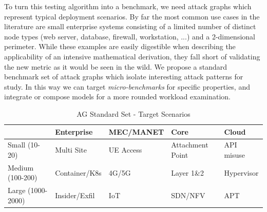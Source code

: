 To turn this testing algorithm into a benchmark, we need attack graphs which represent typical deployment scenarios. By far the most common use cases in the literature are small enterprise systems consisting of a limited number of distinct node types (web server, database, firewall, workstation, ...) and a 2-dimensional perimeter. While these examples are easily digestible when describing the applicability of an intensive mathematical derivation, they fall short of validating the new metric as it would be seen in the wild. We propose a standard benchmark set of attack graphs which isolate interesting attack patterns for study. In this way we can target \textit{micro-benchmarks} for specific properties, and integrate or compose models for a more rounded workload examination.

\begin{table}[ht]
\centering
\caption{AG Standard Set - Target Scenarios}
\label{tab:ag_standard_set}
\begin{tabular}{@{}p{.15\linewidth}p{.15\linewidth}p{.15\linewidth}p{.15\linewidth}p{.15\linewidth}@{}}
\toprule
 & Enterprise & MEC/MANET &  Core &  Cloud \\ \midrule
Small (10-20) & Multi Site & UE Access  & Attachment Point & API misuse \\
Medium (100-200) & Container/K8s & 4G/5G & Layer 1\&2 & Hypervisor  \\
Large (1000-2000) & Insider/Exfil  &  IoT &  SDN/NFV & APT  \\ \bottomrule
\end{tabular}
\end{table}

